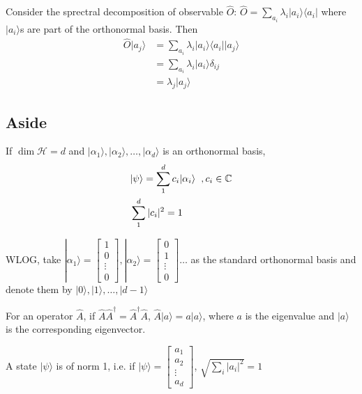 \documentclass{article}
\begin{document}
            Consider the sprectral decomposition of observable $\hat{O}$:
            $
                \hat{O} = \sum_{a_i} \lambda_i | a_i \rangle \langle a_i|
            $ 
            where $|a_i \rangle$s are part of the orthonormal basis. Then 
            \begin{align*}
                \hat{O}|a_j \rangle &= \sum_{a_i} \lambda_i |a_i \rangle \langle a_i | |a_j \rangle\\
                &=\sum_{a_i} \lambda_i |a_i \rangle \delta_{ij}\\
                &= \lambda_j |a_j \rangle
            \end{align*}

        \subsection{Aside}
            If $\dim \mathcal{H} = d$ and ${|\alpha_1 \rangle , |\alpha_2 \rangle , \ldots , |\alpha_d \rangle}$ is an orthonormal basis, 
            \begin{align*}
                &| \psi \rangle = \sum_1^d c_i | \alpha_i \rangle \hspace{0.2cm} ,c_i \in \mathbb{C}\\
                &\sum_1^d |c_i|^2 = 1 
            \end{align*}

            WLOG, take $| \alpha_1 \rangle = \begin{bmatrix}
                1\\
                0\\
                \vdots\\
                0
            \end{bmatrix}, |\alpha_2 \rangle = \begin{bmatrix}
                0\\
                1\\
                \vdots\\
                0
            \end{bmatrix} \ldots$ as the standard orthonormal basis and denote them by $|0 \rangle, |1 \rangle , \ldots ,|d-1 \rangle $

            For an operator $\hat{A}$, if $\hat{A} \hat{A}^{\dagger} = \hat{A}^{\dagger} \hat{A}$, $\hat{A}|a \rangle = a | a \rangle$, where $a$ is the eigenvalue and $| a \rangle$ is the corresponding eigenvector.

            A state $|\psi \rangle$ is of norm 1, i.e. if $| \psi \rangle = \begin{bmatrix}
                a_1 \\
                a_2 \\
                \vdots \\
                a_d
            \end{bmatrix}$, 
            $\sqrt{\sum_i |a_i|^2} = 1$
\end{document}
